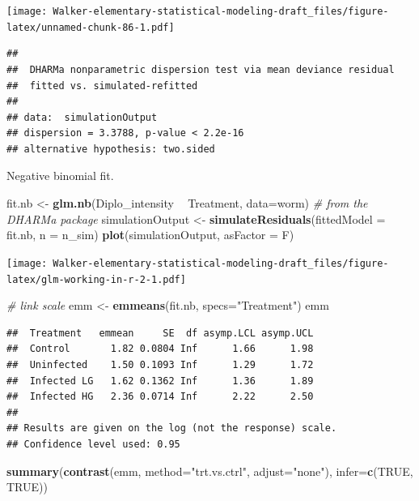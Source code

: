 \documentclass[]{book}
\newenvironment{Shaded}{\begin{snugshade}}{\end{snugshade}}
\newcommand{\KeywordTok}[1]{\textcolor[rgb]{0.13,0.29,0.53}{\textbf{#1}}}
\newcommand{\DataTypeTok}[1]{\textcolor[rgb]{0.13,0.29,0.53}{#1}}
\newcommand{\StringTok}[1]{\textcolor[rgb]{0.31,0.60,0.02}{#1}}
\newcommand{\CommentTok}[1]{\textcolor[rgb]{0.56,0.35,0.01}{\textit{#1}}}
\newcommand{\OtherTok}[1]{\textcolor[rgb]{0.56,0.35,0.01}{#1}}
\newcommand{\OperatorTok}[1]{\textcolor[rgb]{0.81,0.36,0.00}{\textbf{#1}}}
\newcommand{\NormalTok}[1]{#1}
\begin{document}
\texttt{[image: Walker-elementary-statistical-modeling-draft\_files/figure-latex/unnamed-chunk-86-1.pdf]}

\begin{verbatim}
## 
##  DHARMa nonparametric dispersion test via mean deviance residual
##  fitted vs. simulated-refitted
## 
## data:  simulationOutput
## dispersion = 3.3788, p-value < 2.2e-16
## alternative hypothesis: two.sided
\end{verbatim}

Negative binomial fit.

\begin{Shaded}
\begin{Highlighting}[]
\NormalTok{fit.nb <-}\StringTok{ }\KeywordTok{glm.nb}\NormalTok{(Diplo_intensity }\OperatorTok{~}\StringTok{ }\NormalTok{Treatment, }\DataTypeTok{data=}\NormalTok{worm)}
\CommentTok{# from the DHARMa package}
\NormalTok{  simulationOutput <-}\StringTok{ }\KeywordTok{simulateResiduals}\NormalTok{(}\DataTypeTok{fittedModel =}\NormalTok{ fit.nb, }\DataTypeTok{n =}\NormalTok{ n_sim)}
  \KeywordTok{plot}\NormalTok{(simulationOutput, }\DataTypeTok{asFactor =}\NormalTok{ F)}
\end{Highlighting}
\end{Shaded}

\texttt{[image: Walker-elementary-statistical-modeling-draft\_files/figure-latex/glm-working-in-r-2-1.pdf]}

\begin{Shaded}
\begin{Highlighting}[]
\CommentTok{# link scale}
\NormalTok{emm <-}\StringTok{ }\KeywordTok{emmeans}\NormalTok{(fit.nb, }\DataTypeTok{specs=}\StringTok{"Treatment"}\NormalTok{)}
\NormalTok{emm}
\end{Highlighting}
\end{Shaded}

\begin{verbatim}
##  Treatment   emmean     SE  df asymp.LCL asymp.UCL
##  Control       1.82 0.0804 Inf      1.66      1.98
##  Uninfected    1.50 0.1093 Inf      1.29      1.72
##  Infected LG   1.62 0.1362 Inf      1.36      1.89
##  Infected HG   2.36 0.0714 Inf      2.22      2.50
## 
## Results are given on the log (not the response) scale. 
## Confidence level used: 0.95
\end{verbatim}

\begin{Shaded}
\begin{Highlighting}[]
\KeywordTok{summary}\NormalTok{(}\KeywordTok{contrast}\NormalTok{(emm, }\DataTypeTok{method=}\StringTok{"trt.vs.ctrl"}\NormalTok{, }\DataTypeTok{adjust=}\StringTok{"none"}\NormalTok{), }\DataTypeTok{infer=}\KeywordTok{c}\NormalTok{(}\OtherTok{TRUE}\NormalTok{, }\OtherTok{TRUE}\NormalTok{))}
\end{Highlighting}
\end{Shaded}
\end{document}
